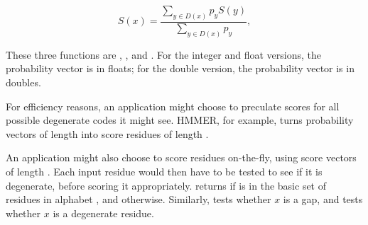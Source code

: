 \[
  S(x) =  \frac{\sum_{y \in D(x)}  p_y S(y) } { \sum_{y \in D(x)} p_y },
\]

These three functions are ,
, and
.  For the integer and float
versions, the probability vector is in floats; for the double version,
the probability vector is in doubles.

For efficiency reasons, an application might choose to preculate
scores for all possible degenerate codes it might see. HMMER, for
example, turns probability vectors of length  into score
residues of length .

An application might also choose to score residues on-the-fly, using
score vectors of length . Each input residue  would
then have to be tested to see if it is degenerate, before scoring it
appropriately.   returns 
if  is in the basic set of  residues in alphabet
, and  otherwise. Similarly,
 tests whether $x$ is a gap, and
 tests whether $x$ is a degenerate
residue.

